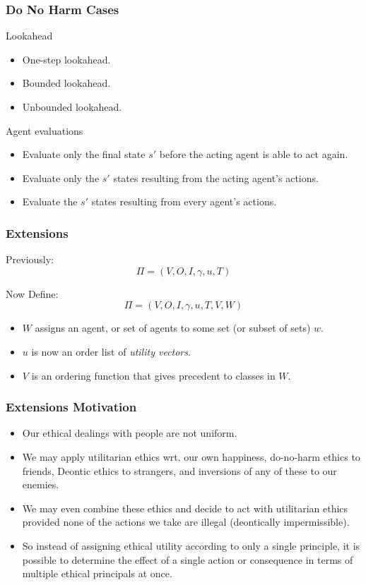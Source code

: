 \documentclass{beamer}
\begin{document}
 
 \begin{frame}
\frametitle{Do No Harm Cases}

Lookahead
\begin{itemize}
\item One-step lookahead.
\item Bounded lookahead.
\item Unbounded lookahead.
\end{itemize}

Agent evaluations
\begin{itemize}
\item Evaluate only the final state $s'$ before the acting agent is able to act again.
\item Evaluate only the $s'$ states resulting from the acting agent's actions.
\item Evaluate the $s'$ states resulting from every agent's actions.
\end{itemize}

 \end{frame} 
 


 \begin{frame}
\frametitle{Extensions}
Previously:
\[
\Pi = (V, O, I, \gamma, u, T)
\]

Now Define:
\[
\Pi = (V, O, I, \gamma, u, T, V, W)
\]

\begin{itemize}
\item $W$ assigns an agent, or set of agents to some set (or subset of sets) $w$.
\item $u$ is now an order list of \textit{utility vectors}.
\item $V$ is an ordering function that gives precedent to classes in $W$.
\end{itemize}

 \end{frame} 
 
\begin{frame}
\frametitle{Extensions Motivation}
\begin{itemize}
\item Our ethical dealings with people are not uniform.
\item We may apply utilitarian ethics wrt. our own happiness, do-no-harm ethics to friends, Deontic ethics to strangers, and inversions of any of these to our enemies.
\item We may even combine these ethics and decide to act with utilitarian ethics provided none of the actions we take are illegal (deontically impermissible).
\item So instead of assigning ethical utility according to only a single principle, it is possible to determine the effect of a single action or consequence in terms of multiple ethical principals at once.
\end{itemize}
 \end{frame}  
 
\end{document}
